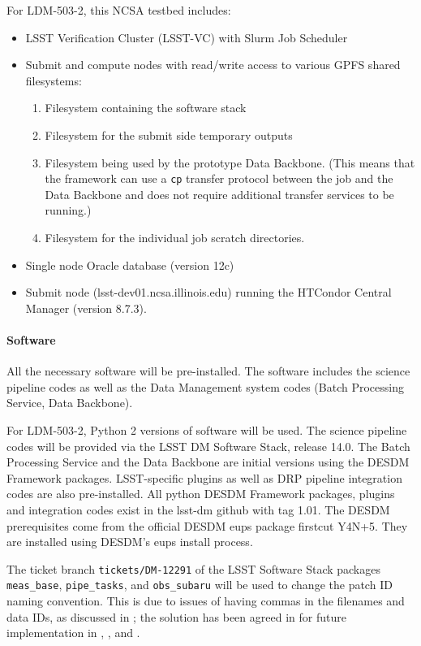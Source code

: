 For LDM-503-2, this NCSA testbed includes:
\begin{itemize}
\item{LSST Verification Cluster (LSST-VC) with Slurm Job Scheduler}
\item{Submit and compute nodes with read/write access to various GPFS shared filesystems:}
\begin{enumerate}
\item{Filesystem containing the software stack}
\item{Filesystem for the submit side temporary outputs}
\item{Filesystem being used by the prototype Data Backbone. (This means that the framework can use a \texttt{cp} transfer protocol between the job and the Data Backbone and does not require additional transfer services to be running.)}
\item{Filesystem for the individual job scratch directories.}
\end{enumerate}
\item{Single node Oracle database (version 12c)}
\item{Submit node (lsst-dev01.ncsa.illinois.edu) running the HTCondor Central Manager (version 8.7.3).}
\end{itemize}

\paragraph{Software}\label{sec:software}
All the necessary software will be pre-installed. The software
includes the science pipeline codes as well as the Data Management
system codes (Batch Processing Service, Data Backbone).

For LDM-503-2, Python 2 versions of software will be used. The
science pipeline codes will be provided via the LSST DM Software
Stack, release 14.0.  The Batch Processing Service and the Data Backbone
are initial versions using the DESDM Framework packages.  LSST-specific
plugins as well as DRP pipeline integration codes are also pre-installed.
All python DESDM Framework packages, plugins and integration codes exist
in the lsst-dm github with tag 1.01. The DESDM prerequisites come from
the official DESDM eups package firstcut Y4N+5.   They are installed
using DESDM's eups install process.

The ticket branch \texttt{tickets/DM-12291} of the LSST Software Stack
packages \texttt{meas{\_}base}, \texttt{pipe{\_}tasks}, and
\texttt{obs{\_}subaru} will be used to change the patch ID naming
convention.  This is due to issues of having commas in the filenames
and data IDs, as discussed in ; the solution has been
agreed in  for future implementation in ,
, and .


